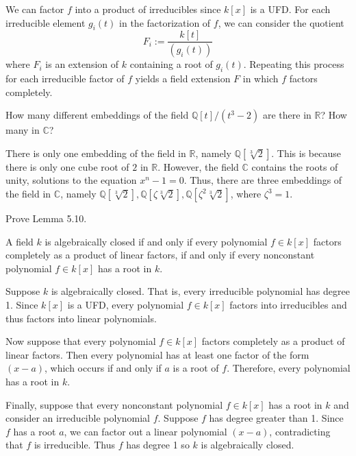 \documentclass[../../master.tex]{subfiles}
\begin{document}
\begin{solution}
    We can factor $f$ into a product of irreducibles since $k[x]$ is a UFD.
    For each irreducible element $g_i(t)$ in the factorization of $f$, we can consider the quotient
    \[
        F_i := \frac{k[t]}{(g_i(t))}
    \]
    where $F_i$ is an extension of $k$ containing a root of $g_i(t)$.
    Repeating this process for each irreducible factor of $f$ yields a field extension $F$ in which $f$ factors completely.
\end{solution}

\begin{problem}
    How many different embeddings of the field $\mathbb{Q}[t] / (t^3 - 2)$ are there in $\mathbb{R}$?
    How many in $\mathbb{C}$?
\end{problem}

\begin{solution}
    There is only one embedding of the field in $\mathbb{R}$, namely $\mathbb{Q}[\sqrt[3]{2}]$.
    This is because there is only one cube root of $2$ in $\mathbb{R}$.
    However, the field $\mathbb{C}$ contains the roots of unity, solutions to the equation $x^{n} - 1 = 0$.
    Thus, there are three embeddings of the field in $\mathbb{C}$, namely $\mathbb{Q}[\sqrt[3]{2}], \mathbb{Q}[\zeta \sqrt[3]{2}], \mathbb{Q}[\zeta^2 \sqrt[3]{2}]$, where $\zeta^3 = 1$.
\end{solution}

\begin{problem}
    Prove Lemma 5.10.
    \begin{proposition}[Lemma 5.10] 
        A field $k$ is algebraically closed if and only if every polynomial $f \in k[x]$ factors completely as a product of linear factors, if and only if every nonconstant polynomial $f \in k[x]$ has a root in $k$.
    \end{proposition}
\end{problem}

\begin{solution}
    Suppose $k$ is algebraically closed. 
    That is, every irreducible polynomial has degree 1.
    Since $k[x]$ is a UFD, every polynomial $f \in k[x]$ factors into irreducibles and thus factors into linear polynomials.

    Now suppose that every polynomial $f \in k[x]$ factors completely as a product of linear factors.
    Then every polynomial has at least one factor of the form $(x - a)$, which occurs if and only if $a$ is a root of $f$.
    Therefore, every polynomial has a root in $k$.

    Finally, suppose that every nonconstant polynomial $f \in k[x]$ has a root in $k$ and consider an irreducible polynomial $f$.
    Suppose $f$ has degree greater than 1.
    Since $f$ has a root $a$, we can factor out a linear polynomial $(x - a)$, contradicting that $f$ is irreducible.
    Thus $f$ has degree 1 so $k$ is algebraically closed.
\end{solution}
\end{document}
